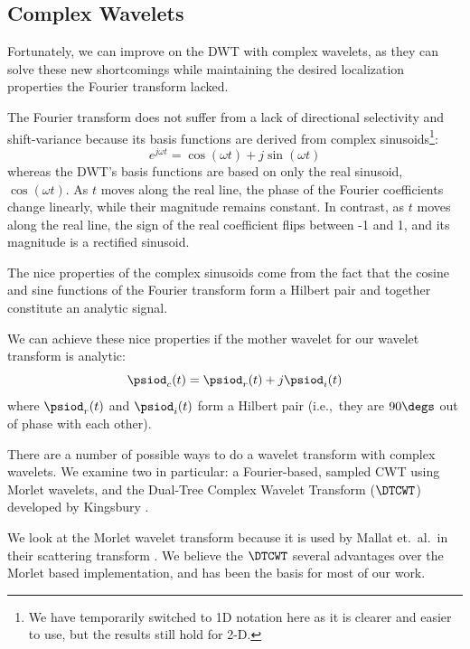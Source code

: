 \subsection{Complex Wavelets}\label{sec:ch2:complex_wavelets}
  Fortunately, we can improve on the DWT with complex wavelets, as they can
  solve these new shortcomings while maintaining the desired localization
  properties the Fourier transform lacked.

  The Fourier transform does not suffer from a lack of directional selectivity
  and shift-variance because its basis functions are derived from complex
  sinusoids\footnote{We have temporarily switched to 1D
  notation here as it is clearer and easier to use, but the results still hold
  for 2-D.}:
  \begin{equation}
    e^{j\omega t} = \cos(\omega t) + j\sin(\omega t)
  \end{equation}
  whereas the DWT's basis functions are based on only the real
  sinusoid, $\cos(\omega t)$. As $t$ moves along the real line, the phase of the
  Fourier coefficients change linearly, while their magnitude remains constant. In
  contrast, as $t$ moves along the real line, the sign of the real coefficient
  flips between -1 and 1, and its magnitude is a rectified sinusoid.

  The nice properties of the complex sinusoids come from the fact that the
  cosine and sine functions of the Fourier transform form a Hilbert pair and
  together constitute an analytic signal.

  We can achieve these nice properties if the mother wavelet for our wavelet
  transform is analytic:
  \begin{equation}
    \psiod_{c}(t) = \psiod_{r}(t) + j\psiod_{i}(t) \label{eq:ch2:complex_wavelet}
  \end{equation}
  where $\psiod_{r}(t)$ and $\psiod_{i}(t)$ form a Hilbert pair (i.e.,\ they are
  $90\degs$ out of phase with each other).

  There are a number of possible ways to do a wavelet transform with complex
  wavelets. We examine two in particular: a Fourier-based, sampled CWT using
  Morlet wavelets, and the Dual-Tree Complex Wavelet Transform ($\DTCWT$)
  developed by Kingsbury \cite{kingsbury_wavelet_1998, kingsbury_dual-tree_1998,
  kingsbury_dual-tree_1998-1,  kingsbury_image_1999, kingsbury_shift_1999,
  kingsbury_dual-tree_2000, kingsbury_complex_2001, selesnick_dual-tree_2005}.

  We look at the Morlet wavelet transform because it is used by
  Mallat et.\ al.\ in their scattering transform
  \cite{bruna_classification_2011, bruna_invariant_2013, bruna_scattering_2013,
  oyallon_generic_2013, oyallon_deep_2015, sifre_rotation_2013,
  sifre_rigid-motion_2014, sifre_rigid-motion_2014-1, sifre_scatnet_2013}.
  We believe the $\DTCWT$
  several advantages over the Morlet based implementation, and has been the
  basis for most of our work.


